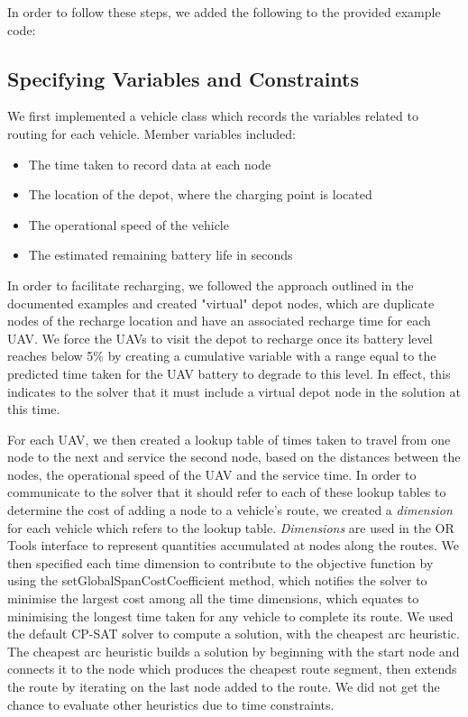 In order to follow these steps, we added the following to the provided example code:

\subsection{Specifying Variables and Constraints}
We first implemented a vehicle class which records the variables related to routing for each vehicle. Member variables included:
\begin{itemize}
    \item The time taken to record data at each node
    \item The location of the depot, where the charging point is located
    \item The operational speed of the vehicle
    \item The estimated remaining battery life in seconds
\end{itemize}
In order to facilitate recharging, we followed the approach outlined in the documented examples and created "virtual" depot nodes, which are duplicate nodes of the recharge location and have an associated recharge time for each UAV.  We force the UAVs to visit the depot to recharge once its battery level reaches below 5\% by creating a cumulative variable with a range equal to the predicted time taken for the UAV battery to degrade to this level. In effect, this indicates to the solver that it must include a virtual depot node in the solution at this time.

For each UAV, we then created a lookup table of times taken to travel from one node to the next and service the second node, based on the distances between the nodes, the operational speed of the UAV and the service time. In order to communicate to the solver that it should refer to each of these lookup tables to determine the cost of adding a node to a vehicle's route, we created a \textit{dimension} for each vehicle which refers to the lookup table. \textit{Dimensions} are used in the OR Tools interface to represent quantities accumulated at nodes along the routes. We then specified each time dimension to contribute to the objective function by using the setGlobalSpanCostCoefficient method, which notifies the solver to minimise the largest cost among all the time dimensions, which equates to minimising the longest time taken for any vehicle to complete its route. We used the default CP-SAT solver to compute a solution, with the cheapest arc heuristic. The cheapest arc heuristic builds a solution by beginning with the start node and connects it to the node which produces the cheapest route segment, then extends the route by iterating on the last node added to the route. We did not get the chance to evaluate other heuristics due to time constraints.

